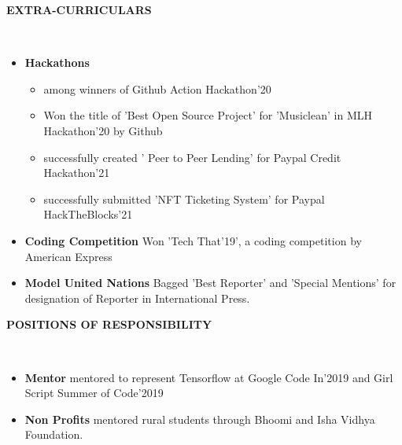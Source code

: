 \documentclass[a4paper,10pt]{article}
\newcommand{\resheading}[1]{{\small \colorbox{mygrey}{\begin{minipage}{0.99\textwidth}{\textbf{#1 \vphantom{p\^{E}}}}\end{minipage}}}}
\begin{document}
\noindent
\resheading{\textbf{EXTRA-CURRICULARS}}\\[-0.2cm]
\begin{itemize}[noitemsep,nolistsep]
\item \textbf{Hackathons}
\begin{itemize}[noitemsep,nolistsep]
        \item among winners of Github Action Hackathon'20
        \item Won the title of 'Best Open Source Project' for 'Musiclean' in MLH Hackathon'20 by Github
        \item successfully created ' Peer to Peer Lending' for Paypal Credit Hackathon'21
        \item successfully submitted 'NFT Ticketing System' for Paypal HackTheBlocks'21
        \\[-0.4cm]
        
    \end{itemize} 
 \item \textbf{Coding Competition} Won 'Tech That'19', a coding competition by American Express \\[-0.4cm]
  \item \textbf{Model United Nations} Bagged 'Best Reporter' and 'Special Mentions' for designation of Reporter in International Press. \\[-0.2cm]

\end{itemize}

\noindent
\resheading{\textbf{POSITIONS OF RESPONSIBILITY}}\\[-0.4cm]
\begin{itemize}
\setlength\itemsep{-0.4em}
\item \textbf{Mentor} mentored to represent Tensorflow at Google Code In'2019 and Girl Script Summer of Code'2019 
 \item \textbf{Non Profits} mentored rural students through Bhoomi and Isha Vidhya Foundation.


\end{itemize}
\end{document}
